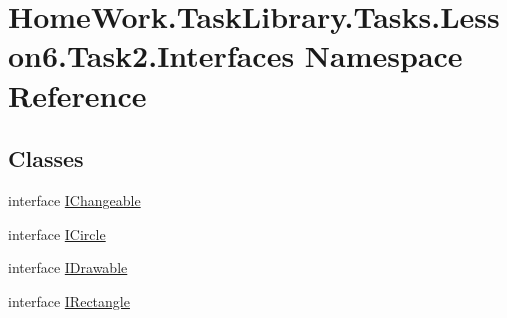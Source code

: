 \hypertarget{namespace_home_work_1_1_task_library_1_1_tasks_1_1_lesson6_1_1_task2_1_1_interfaces}{}\section{Home\+Work.\+Task\+Library.\+Tasks.\+Lesson6.\+Task2.\+Interfaces Namespace Reference}
\label{namespace_home_work_1_1_task_library_1_1_tasks_1_1_lesson6_1_1_task2_1_1_interfaces}
\subsection*{Classes}
\begin{DoxyCompactItemize}
\item 
interface \mbox{\hyperlink{interface_home_work_1_1_task_library_1_1_tasks_1_1_lesson6_1_1_task2_1_1_interfaces_1_1_i_changeable}{I\+Changeable}}
\item 
interface \mbox{\hyperlink{interface_home_work_1_1_task_library_1_1_tasks_1_1_lesson6_1_1_task2_1_1_interfaces_1_1_i_circle}{I\+Circle}}
\item 
interface \mbox{\hyperlink{interface_home_work_1_1_task_library_1_1_tasks_1_1_lesson6_1_1_task2_1_1_interfaces_1_1_i_drawable}{I\+Drawable}}
\item 
interface \mbox{\hyperlink{interface_home_work_1_1_task_library_1_1_tasks_1_1_lesson6_1_1_task2_1_1_interfaces_1_1_i_rectangle}{I\+Rectangle}}
\end{DoxyCompactItemize}
